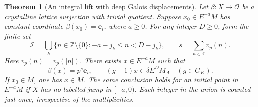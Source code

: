 \documentclass[a4paper,11pt]{article}
\newtheorem{theorem}[proposition]{Theorem}
\theoremstyle{definition}
\theoremstyle{remark}
\newcommand{\ZZ}{\mathbb Z}\newcommand{\ord}{\operatorname{ord}}
\numberwithin{equation}{section}
\begin{document}
\begin{theorem}[An integral lift with deep Galois displacements]
\leavevmode\label{thm:deepintegrallift767}
Let \(\beta:X\to\mathcal O\) be a crystalline lattice
surjection with trivial quotient. Suppose
\(x_0\in E^{-a}M\) has constant coordinate
\(\beta(x_0)=\mathbf e_i\), where \(a\ge0\). For any
integer \(D\ge0\), form the finite set
\[
       \mathcal I=\bigcup_k
         \{n\in\ZZ\setminus\{0\}:-a-j_k\le n<D-j_k\},
       \qquad s=\sum_{n\in\mathcal I}v_p(n).
\]
Here \(v_p(n)=v_p(|n|)\). There exists \(x\in E^{-a}M\)
such that
\[
       \beta(x)=p^s\mathbf e_i,\qquad
       (g-1)x\in\delta E^D M_A\quad(g\in G_K).
\]
If \(x_0\in M\), one has \(x\in M\). The same conclusion
holds for an initial point in \(E^{-a}M\) if \(X\) has
no labelled jump in \([-a,0)\). Each integer in the union
is counted just once, irrespective of the multiplicities.
\end{theorem}
\end{document}
